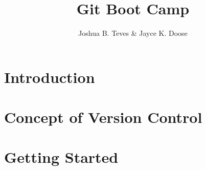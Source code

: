 \documentclass[10pt]{book}
\title{Git Boot Camp}
\author{Joshua B. Teves \& Jayce K. Doose}
\begin{document}
\maketitle

\tableofcontents

\chapter*{Introduction}


\chapter{Concept of Version Control}


\chapter{Getting Started}

\end{document}
